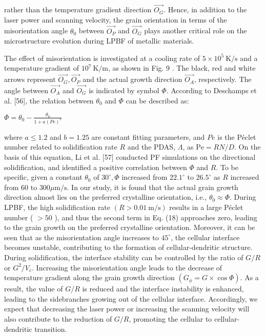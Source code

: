 \documentclass[10pt]{article}
\begin{document}
rather than the temperature gradient direction $\overrightarrow{O_{G}}$. Hence, in addition to the laser power and scanning velocity, the grain orientation in terms of the misorientation angle $\theta_{0}$ between $\overrightarrow{O_{P}}$ and $\overrightarrow{O_{G}}$ plays another critical role on the microstructure evolution during LPBF of metallic materials.

The effect of misorientation is investigated at a cooling rate of $5 \times 10^{5} \mathrm{~K} / \mathrm{s}$ and a temperature gradient of $10^{7} \mathrm{~K} / \mathrm{m}$, as shown in Fig. 9 . The black, red and white arrows represent $\overrightarrow{O_{G}}, \overrightarrow{O_{P}}$ and the actual growth direction $\overrightarrow{O_{A}}$, respectively. The angle between $\overrightarrow{O_{A}}$ and $\overrightarrow{O_{G}}$ is indicated by symbol $\Phi$. According to Deschamps et al. [56], the relation between $\theta_{0}$ and $\Phi$ can be described as:

$\Phi=\theta_{0}-\frac{\theta_{0}}{1+a(P e)^{e}}$

where $a \leq 1.2$ and $b=1.25$ are constant fitting parameters, and $P e$ is the Péclet number related to solidification rate $R$ and the PDAS, $\Lambda$, as $\mathrm{Pe}=R N / D$. On the basis of this equation, Li et al. [57] conducted PF simulations on the directional solidification, and identified a positive correlation between $\Phi$ and $R$. To be specific, given a constant $\theta_{0}$ of $30^{\circ}, \Phi$ increased from $22.1^{\circ}$ to $26.5^{\circ}$ as $R$ increased from 60 to $300 \mu \mathrm{m} / \mathrm{s}$. In our study, it is found that the actual grain growth direction almost lies on the preferred crystalline orientation, i.e., $\theta_{0} \approx \Phi$. During LPBF, the high solidification rate $(R>0.01 \mathrm{~m} / \mathrm{s})$ results in a large Péclet number ( $>50$ ), and thus the second term in Eq. (18) approaches zero, leading to the grain growth on the preferred crystalline orientation. Moreover, it can be seen that as the misorientation angle increases to $45^{\circ}$, the cellular interface becomes unstable, contributing to the formation of cellular-dendritic structure. During solidification, the interface stability can be controlled by the ratio of $G / R$ or $G^{2} / V_{c}$. Increasing the misorientation angle leads to the decrease of temperature gradient along the grain growth direction $\left(G_{\phi}=G \times \cos \Phi\right)$. As a result, the value of $G / R$ is reduced and the interface instability is enhanced, leading to the sidebranches growing out of the cellular interface. Accordingly, we expect that decreasing the laser power or increasing the scanning velocity will also contribute to the reduction of $G / R$, promoting the cellular to cellular-dendritic transition.
\end{document}
